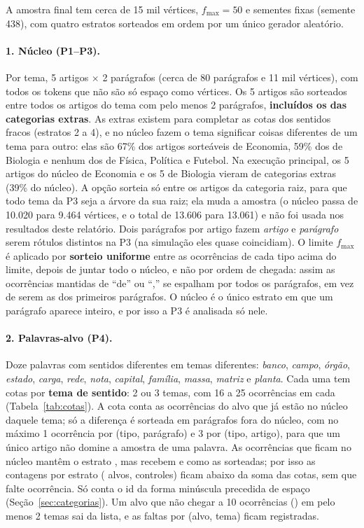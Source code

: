 A amostra final tem cerca de 15 mil vértices, $f_{\max}=50$ e sementes fixas (semente 438),
com quatro estratos sorteados em ordem por um único gerador aleatório.

\paragraph{1. Núcleo (P1--P3).} Por tema, 5 artigos $\times$ 2 parágrafos (cerca de 80
parágrafos e 11 mil vértices), com todos os tokens que não são só espaço como vértices. Os 5
artigos são sorteados entre todos os artigos do tema com pelo menos 2 parágrafos,
\textbf{incluídos os das categorias extras}. As extras existem para completar as cotas dos
sentidos fracos (estratos 2 a 4), e no núcleo fazem o tema significar coisas diferentes de um
tema para outro: elas são 67\% dos artigos sorteáveis de Economia, 59\% dos de Biologia e
nenhum dos de Física, Política e Futebol. Na execução principal, os 5 artigos do núcleo de
Economia e os 5 de Biologia vieram de categorias extras (39\% do núcleo). A opção
 sorteia só entre os artigos da categoria raiz, para que todo tema
da P3 seja a árvore da sua raiz; ela muda a amostra (o núcleo passa de 10.020 para 9.464
vértices, e o total de 13.606 para 13.061) e não foi usada nos resultados deste relatório. Dois
parágrafos por artigo fazem \emph{artigo} e \emph{parágrafo} serem rótulos distintos na P3 (na
simulação eles quase coincidiam). O limite $f_{\max}$ é aplicado por \textbf{sorteio uniforme}
entre as ocorrências de cada tipo acima do limite, depois de juntar todo o núcleo, e não por
ordem de chegada: assim as ocorrências mantidas de ``de'' ou ``,'' se espalham por todos os
parágrafos, em vez de serem as dos primeiros parágrafos. O núcleo é o único estrato em que um
parágrafo aparece inteiro, e por isso a P3 é analisada só nele.

\paragraph{2. Palavras-alvo (P4).} Doze palavras com sentidos diferentes em temas diferentes:
\emph{banco}, \emph{campo}, \emph{órgão}, \emph{estado}, \emph{carga}, \emph{rede},
\emph{nota}, \emph{capital}, \emph{família}, \emph{massa}, \emph{matriz} e \emph{planta}. Cada
uma tem cotas por \textbf{tema de sentido}: 2 ou 3 temas, com 16 a 25 ocorrências em cada
(Tabela~\ref{tab:cotas}). A cota conta as ocorrências do alvo que já estão no núcleo daquele
tema; só a diferença é sorteada em parágrafos fora do núcleo, com no máximo 1 ocorrência por
(tipo, parágrafo) e 3 por (tipo, artigo), para que um único artigo não domine a amostra de uma
palavra. As ocorrências que ficam no núcleo mantêm o estrato , mas recebem
 e  como as sorteadas; por isso as contagens por estrato
(\nVerticesAlvo{} alvos, \nVerticesControle{} controles) ficam abaixo da soma das cotas, sem que
falte ocorrência. Só conta o id da forma minúscula precedida de espaço
(Seção~\ref{sec:categorias}). Um alvo que não chegar a 10 ocorrências ()
em pelo menos 2 temas sai da lista, e as faltas por (alvo, tema) ficam registradas.

